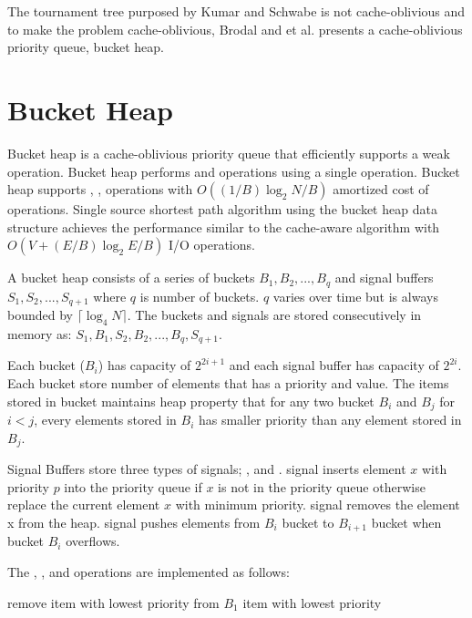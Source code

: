 \documentclass[final,3p]{CSP}
\begin{document}
    The tournament tree purposed by Kumar and Schwabe\cite{kumar1996improved} is not cache-oblivious and to make the problem cache-oblivious, Brodal and et al.\cite{brodal2004cache} presents a cache-oblivious priority queue, bucket heap.

    \section{Bucket Heap}
    Bucket heap is a cache-oblivious priority queue that efficiently supports a weak  operation\cite{brodal2004cache}. Bucket heap performs  and  operations using a single  operation. Bucket heap supports , ,  operations with $O((1/B)\log_2{N/B})$ amortized cost of operations. Single source shortest path algorithm using the bucket heap data structure achieves the performance similar to the cache-aware algorithm\cite{kumar1996improved} with $O(V + (E/B)\log_2{E/B})$ I/O operations.

    A bucket heap consists of a series of buckets $B_1, B_2,...,B_q$ and signal buffers $S_1, S_2,...,S_{q+1}$ where $q$ is number of buckets. $q$ varies over time but is always bounded by $\lceil \log_4{N} \rceil$. The buckets and signals are stored consecutively in memory as: $S_1, B_1, S_2, B_2,..., B_q, S_{q+1}$.

    Each bucket ($B_i$) has capacity of $2^{2i + 1}$ and each signal buffer has capacity of $2^{2i}$. Each bucket store number of elements that has a priority and value. The items stored in bucket maintains heap property that for any two bucket $B_i$ and $B_j$ for $i < j$, every elements stored in $B_i$ has smaller priority than any element stored in $B_j$.

    Signal Buffers store three types of signals; ,  and .  signal inserts element $x$ with priority $p$ into the priority queue if $x$ is not in the priority queue otherwise replace the current element $x$ with minimum priority.  signal removes the element x from the heap.  signal pushes elements from $B_i$ bucket to $B_{i+1}$ bucket when bucket $B_i$ overflows.

    The , , and  operations are implemented as follows:

    \begin{algorithm}
        \caption{}\label{deleteminBucketHeap}
        \begin{algorithmic}[1]
            \State {}
            \State remove item with lowest priority from $B_1$
            \State \Return item with lowest priority
        \end{algorithmic}
    \end{algorithm}
\end{document}

